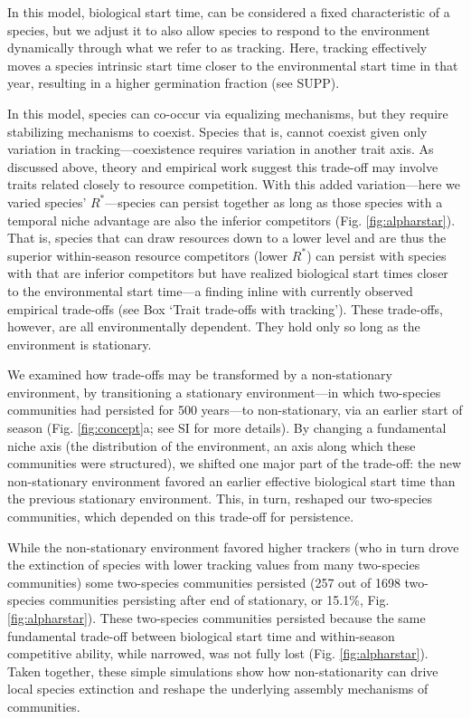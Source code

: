 \documentclass[11pt,letterpaper]{article}
\begin{document}
In this model, biological start time, can be considered a fixed characteristic of a species, but we adjust it to also allow species to respond to the environment dynamically through what we refer to as tracking. Here, tracking effectively moves a species intrinsic start time closer to the environmental start time in that year, resulting in a higher germination fraction (see SUPP).

In this model, species can co-occur via equalizing mechanisms, but they require stabilizing mechanisms to coexist. Species that is, cannot coexist given only variation in tracking---coexistence requires variation in another trait axis. As discussed above, theory and empirical work suggest this trade-off may involve traits related closely to resource competition. With this added variation---here we varied species' $R^*$---species can persist together as long as those species with a temporal niche advantage are also the inferior competitors (Fig. \ref{fig:alpharstar}). That is, species that can draw resources down to a lower level and are thus the superior within-season resource competitors (lower $R^*$) can persist with species with that are inferior competitors but have realized biological start times closer to the environmental start time---a finding inline with currently observed empirical trade-offs (see Box `Trait trade-offs with tracking'). These trade-offs, however, are all environmentally dependent. They hold only so long as the environment is stationary. 

We examined how trade-offs may be transformed by a non-stationary environment, by transitioning a stationary environment---in which two-species communities had persisted for 500 years---to non-stationary, via an earlier start of season (Fig. \ref {fig:concept}a; see SI for more details). By changing a fundamental niche axis (the distribution of the environment, an axis along which these communities were structured), we shifted one major part of the trade-off: the new non-stationary environment favored an earlier effective biological start time than the previous stationary environment. This, in turn, reshaped our two-species communities, which depended on this trade-off for persistence. 

While the non-stationary environment favored higher trackers (who in turn drove the extinction of species with lower tracking values from many two-species communities) some two-species communities persisted (257 out of 1698 two-species communities persisting after end of stationary, or 15.1\%, Fig. \ref{fig:alpharstar}). These two-species communities persisted because the same fundamental trade-off between biological start time and within-season competitive ability, while narrowed, was not fully lost (Fig. \ref{fig:alpharstar}). Taken together, these simple simulations show how non-stationarity can drive local species extinction and reshape the underlying assembly mechanisms of communities.
\end{document}
